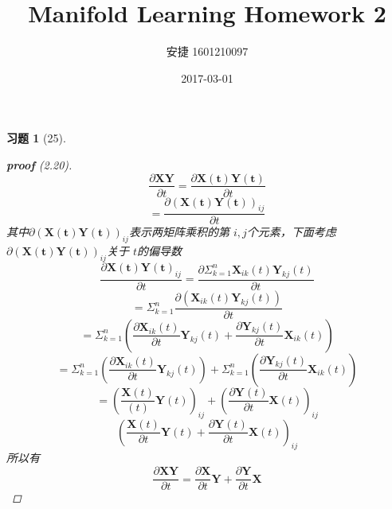 \documentclass[a4paper, UTF8]{ctexart}
\title{Manifold Learning Homework 2}
\date{2017-03-01}
\author{安捷 1601210097}
\newtheorem*{exercise}{\textbf{习题}}
\begin{document}
\maketitle
  \begin{exercise}[25]
    \begin{proof}[\textbf{proof} (2.20)]
      \begin{equation*}
        \frac{\partial \mathbf{XY}}{\partial t} = \frac{\partial \mathbf{X \left(t\right)}\mathbf{Y \left(t\right)}}{\partial t}
      \end{equation*}
      \begin{equation*}
        = \frac{ \partial \left( \mathbf{X \left( t \right) Y \left( t \right)} \right)_{ij} }{\partial t}
      \end{equation*}
      其中$\partial \left( \mathbf{X \left( t \right) Y \left( t \right)} \right)_{ij}$表示两矩阵乘积的第 $i,j$个元素，下面考虑$\partial \left( \mathbf{X \left( t \right) Y \left( t \right)} \right)_{ij}$关于 $t$的偏导数
      \begin{equation*}
        \frac{\partial \mathbf{X \left( t \right) Y \left( t \right)}_{ij} }{\partial t} = \frac{\partial \Sigma_{k=1}^n \mathbf{X}_{ik} \left( t \right)\mathbf{Y}_{kj} \left( t \right)}{\partial t}
      \end{equation*}
      \begin{equation*}
        = \Sigma_{k=1}^n \frac{\partial \left( \mathbf{X}_{ik}\left( t \right)\mathbf{Y}_{kj}\left( t \right) \right)}{\partial t}
      \end{equation*}
      \begin{equation*}
        = \Sigma_{k=1}^n\left( \frac{\partial\mathbf{X}_{ik}\left(t\right)}{\partial t}\mathbf{Y}_{kj}\left( t \right) + \frac{\partial \mathbf{Y}_{kj}\left( t \right)}{\partial t}\mathbf{X}_{ik}\left( t \right)\right)
      \end{equation*}
      \begin{equation*}
        = \Sigma_{k=1}^n \left( \frac{\partial \mathbf{X}_{ik} \left( t \right) }{\partial t}\mathbf{Y}_{kj}\left( t \right) \right) + \Sigma_{k=1}^n \left( \frac{\partial \mathbf{Y}_{kj}\left( t \right)}{\partial t} \mathbf{X}_{ik}\left( t \right)\right)
      \end{equation*}
      \begin{equation*}
        = \left( \frac{\mathbf{X}\left( t \right)}{\left( t \right)}\mathbf{Y} \left( t \right)\right)_{ij} + \left( \frac{\partial \mathbf{Y}\left( t \right)}{\partial t }\mathbf{X}\left( t \right)\right)_{ij}
      \end{equation*}
      \begin{equation*}
        \left( \frac{\mathbf{X}\left( t \right)}{\partial t}\mathbf{Y}\left( t \right) + \frac{\partial \mathbf{Y}\left( t \right)}{\partial t}\mathbf{X}\left( t \right)\right)_{ij}
      \end{equation*}
      所以有
      \begin{equation*}
        \frac{\partial\mathbf{XY}}{\partial t} = \frac{\partial \mathbf{X}}{\partial t} \mathbf{Y} + \frac{\partial \mathbf{Y}}{\partial t} \mathbf{X}
      \end{equation*}

    \end{proof}
  \end{exercise}
\end{document}
